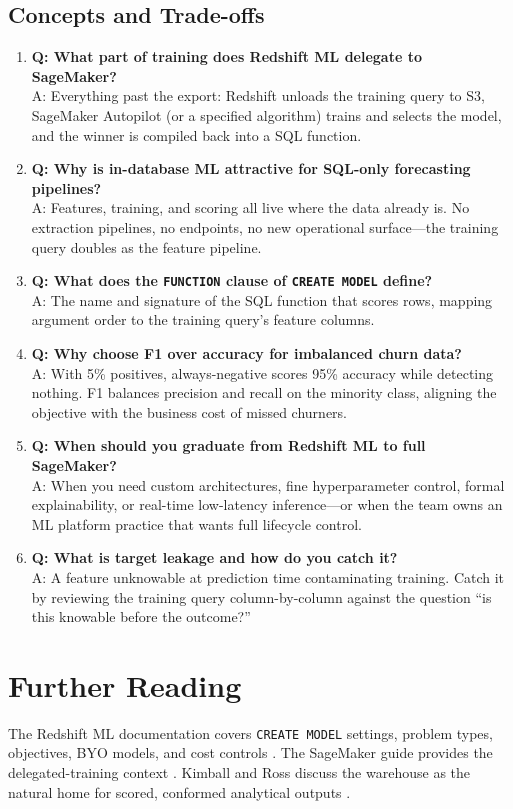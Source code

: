 \subsection{Concepts and Trade-offs}
\begin{enumerate}
    \item \textbf{Q: What part of training does Redshift ML delegate to SageMaker?}\\
    A: Everything past the export: Redshift unloads the training query to S3, SageMaker Autopilot (or a specified algorithm) trains and selects the model, and the winner is compiled back into a SQL function.
    \item \textbf{Q: Why is in-database ML attractive for SQL-only forecasting pipelines?}\\
    A: Features, training, and scoring all live where the data already is. No extraction pipelines, no endpoints, no new operational surface---the training query doubles as the feature pipeline.
    \item \textbf{Q: What does the \texttt{FUNCTION} clause of \texttt{CREATE MODEL} define?}\\
    A: The name and signature of the SQL function that scores rows, mapping argument order to the training query's feature columns.
    \item \textbf{Q: Why choose F1 over accuracy for imbalanced churn data?}\\
    A: With 5\% positives, always-negative scores 95\% accuracy while detecting nothing. F1 balances precision and recall on the minority class, aligning the objective with the business cost of missed churners.
    \item \textbf{Q: When should you graduate from Redshift ML to full SageMaker?}\\
    A: When you need custom architectures, fine hyperparameter control, formal explainability, or real-time low-latency inference---or when the team owns an ML platform practice that wants full lifecycle control.
    \item \textbf{Q: What is target leakage and how do you catch it?}\\
    A: A feature unknowable at prediction time contaminating training. Catch it by reviewing the training query column-by-column against the question ``is this knowable before the outcome?''
\end{enumerate}

\section{Further Reading}
The Redshift ML documentation covers \texttt{CREATE MODEL} settings, problem types, objectives, BYO models, and cost controls \cite{awsRedshiftMLDocs}. The SageMaker guide provides the delegated-training context \cite{awsSageMakerDocs}. Kimball and Ross discuss the warehouse as the natural home for scored, conformed analytical outputs \cite{kimballDWToolkit}.

